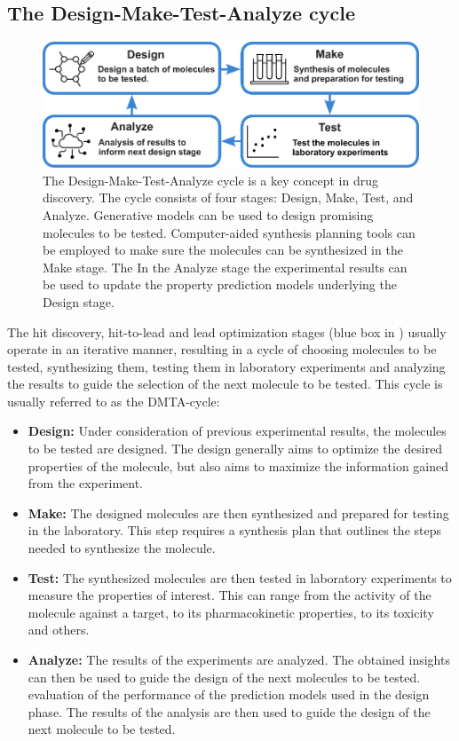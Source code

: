 \subsection{The Design-Make-Test-Analyze cycle}
\begin{figure}
      \centering
      \includegraphics[width=\textwidth]{figures/dmta_cycle_v2.pdf}
      \caption{The Design-Make-Test-Analyze cycle is a key concept in drug discovery. The cycle
            consists of four stages: Design, Make, Test, and Analyze. Generative models can be used
            to design promising molecules to be tested. Computer-aided synthesis planning tools can
            be employed to make sure the molecules can be synthesized in the Make stage. The
            In the Analyze stage the experimental results can be used to update the property prediction
            models underlying the Design stage.
            \label{fig:dmta-cycle}}
\end{figure}
The hit discovery, hit-to-lead and lead optimization stages (blue box in
) usually operate in an iterative manner, resulting in a cycle of
choosing molecules to be tested, synthesizing them, testing them in laboratory experiments and
analyzing the results to guide the selection of the next molecule to be tested. This cycle is
usually referred to as the \ac{DMTA}-cycle:
\begin{itemize}
      \item \textbf{Design:} Under consideration of previous experimental results, the molecules to
            be tested are designed. The design generally aims to optimize the desired properties of
            the molecule, but also aims to maximize the information gained from the experiment.
      \item \textbf{Make:} The designed molecules are then synthesized and prepared for testing in
            the laboratory. This step requires a synthesis plan that outlines the steps needed to
            synthesize the molecule.
      \item \textbf{Test:} The synthesized molecules are then tested in laboratory experiments to
            measure the properties of interest. This can range from the activity of the molecule
            against a target, to its pharmacokinetic properties, to its toxicity and others.
      \item \textbf{Analyze:} The results of the experiments are analyzed. The obtained insights
            can then be used to guide the design of the next molecules to be tested.
            evaluation of the performance of the prediction models used in the design phase. The
            results of the analysis are then used to guide the design of the next molecule to be
            tested.
\end{itemize}


